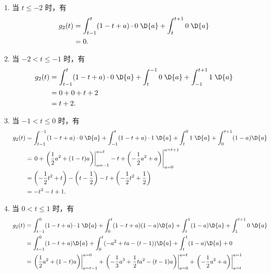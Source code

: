 \begin{solution}
\begin{enumerate}[label=(\arabic*)]
            \begin{enumerate}
                \item 当 $t \le -2$ 时，有
                    \begin{align*}
                        g_2(t) & = \int_{t - 1}^{t}(1 - t + a) \cdot 0\;\D{a} + \int_{t}^{t + 1}0\;\D{a} \\
                        & = 0.
                    \end{align*}
                \item 当 $-2 < t \le -1$ 时，有
                    \begin{align*}
                        g_2(t) & = \int_{t - 1}^{t}(1 - t + a) \cdot 0\;\D{a} + \int_{t}^{-1}0\;\D{a} + \int_{-1}^{t + 1}1\;\D{a} \\
                        & = 0 + 0 + t + 2 \\
                        & = t + 2.
                    \end{align*}
                \item 当 $-1 < t \le 0$ 时，有
                    \begin{align*}
                        g_2(t) & = \int_{t - 1}^{-1}(1 - t + a)\cdot 0\;\D{a} + \int_{-1}^{t}(1 - t + a)\cdot 1\;\D{a} + \int_{t}^{0}1\;\D{a} + \int_{0}^{t + 1}(1 - a)\D{a} \\
                        & = \left.0 + \left.\left(\frac{1}{2}a^2 + (1 - t)a\right)\right|_{a = -1}^{a = t} - t + \left(-\frac{1}{2}a^2 + a\right)\right|_{a = 0}^{a = t + 1} \\
                        & = \left(-\frac{1}{2}t^2 + t\right) - \left(t - \frac{1}{2}\right) - t + \left(-\frac{1}{2}t^2 + \frac{1}{2}\right) \\
                        & = -t^2 - t + 1.
                    \end{align*}
                \item 当 $0 < t \le 1$ 时，有
                    \begin{align*}
                        g_2(t) & = \int_{t - 1}^{0}(1 - t + a)\cdot 1\;\D{a} + \int_{0}^{t}(1 - t + a)(1 - a)\D{a} + \int_{t}^{1}(1 - a)\D{a} + \int_{1}^{t + 1}0\;\D{a} \\
                        & = \int_{t - 1}^{0}(1 - t + a)\D{a} + \int_{0}^{t}(-a^2 + ta - (t - 1))\D{a} + \int_{t}^{1}(1 - a)\D{a} + 0 \\
                        & = \left.\left(\frac{1}{2}a^2 + (1 - t)a\right)\right|_{a = t - 1}^{a = 0} + \left.\left(-\frac{1}{3}a^3 + \frac{1}{2}ta^2 - (t - 1)a\right)\right|_{a = 0}^{a = t} + \left.\left(-\frac{1}{2}a^2 + a\right)\right|_{a = t}^{a = 1} \\

\end{align*}
\end{enumerate}
\end{enumerate}
\end{solution}
